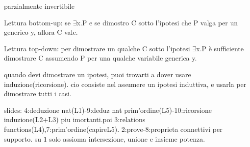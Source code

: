 \documentclass[12pt]{article}
\begin{document}
parzialmente invertibile

Lettura bottom-up: se $\exists$x.P e se dimostro C sotto l’ipotesi che
P valga per un generico y, allora C vale.

Lettura top-down: per dimostrare un qualche C sotto l’ipotesi
$\exists$x.P è sufficiente dimostrare C assumendo P per una qualche
variabile generica y.


quando devi dimostrare un ipotesi, puoi trovarti a dover usare induzione(ricorsione).
cio consiste nel assumere un ipotesi induttiva, e usarla per dimostrare tutti i casi.

slides: 4:deduzione nat(L1)-9:deduz nat prim'ordine(L5)-10:ricorsione induzione(L2+L3) piu imortanti.poi 3:relations functions(L4),7:prim'ordine(capireL5). 2:prove-8:proprieta connettivi per supporto. su 1 solo assioma intersezione, unione e insieme potenza.
\end{document}
